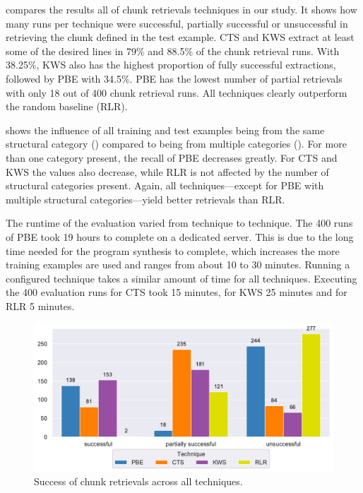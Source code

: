 \documentclass[10pt,journal,compsoc]{IEEEtran}
\begin{document}
 compares the results all of chunk
retrievals techniques in our study.
It shows how many runs per technique were successful, partially
successful or unsuccessful in retrieving the chunk defined in the
test example.
CTS and KWS
extract at least some of the desired lines in 79\% and 88.5\%
of the chunk retrieval runs.
With 38.25\%, KWS also has the highest proportion of fully
successful extractions, followed by PBE with 34.5\%.
PBE has the
lowest number of partial retrievals with only 18 out of 400 chunk
retrieval runs.
All techniques clearly outperform the random baseline (RLR).

shows the influence of all training and test examples being from the
same structural category
()
compared to being from multiple categories
().
For more
than one category present, the recall of PBE decreases greatly.
For CTS and KWS the values also decrease, while RLR is not affected by
the number of structural categories present.
Again, all techniques---except for PBE with multiple structural
categories---yield better retrievals than RLR.

The runtime of the evaluation varied from technique to technique.
The 400 runs of PBE took 19 hours to complete on a dedicated server.
This is due to the long time needed for the program synthesis to
complete, which increases the more training examples are used and
ranges from about 10 to 30 minutes.
Running a configured technique takes a similar amount of time for all
techniques.
Executing the 400 evaluation runs for CTS took 15 minutes, for KWS 25
minutes and for RLR 5 minutes.

\begin{figure}[!t]
		\centering
		\includegraphics[width=\columnwidth,
		clip]{img/big-study/success-partial-all.pdf}
		\caption{Success of chunk retrievals across all
		techniques.}
		\label{fig:success-partial-all}
\end{figure}
\end{document}
